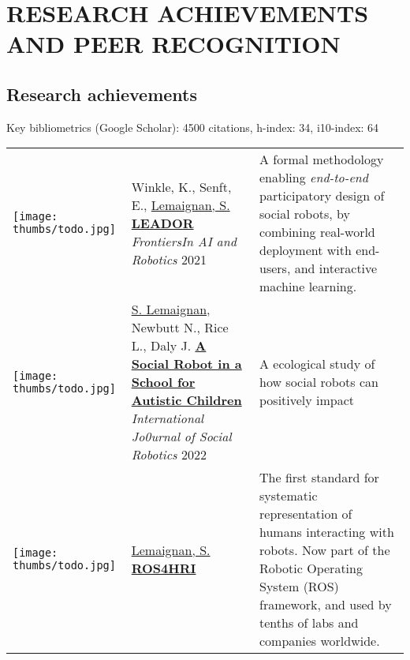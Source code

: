 \section{RESEARCH ACHIEVEMENTS AND PEER RECOGNITION}

\subsection{Research achievements}

Key bibliometrics (Google Scholar): 4500 citations, h-index: 34, i10-index: 64


\hspace*{-0.5cm}\begin{tabular}{p{1.7cm}p{7cm}p{8cm}}

    \vspace{-0.2cm}\texttt{[image: thumbs/todo.jpg]} &
    Winkle, K., Senft, E., \ul{Lemaignan, S.}
    \newline\href{}{\textbf{LEADOR}}
    \newline \textit{FrontiersIn AI and Robotics} 2021
    & \small A formal methodology enabling \emph{end-to-end} participatory
    design of social robots, by combining real-world deployment with end-users,
    and interactive machine learning.\textbf{} \\

    \vspace{-0.2cm}\texttt{[image: thumbs/todo.jpg]} &
    \ul{S. Lemaignan}, Newbutt N., Rice L., Daly J.
    \newline\href{https://doi.org/10.1007/s12369-022-00928-4}{\textbf{A Social Robot in a School for Autistic Children}}
    \newline \textit{International Jo0urnal of Social Robotics} 2022
    & \small A ecological study of how social robots can positively impact \textbf{} \\






    \vspace{-0.2cm}\texttt{[image: thumbs/todo.jpg]} &
    \ul{Lemaignan, S.}
    \newline\href{https://wiki.ros.org/hri}{\textbf{ROS4HRI}}
    \newline 2022
    & \small The first standard for systematic representation of humans
    interacting with robots. Now part of the Robotic Operating System (ROS)
    framework, and used by tenths of labs and companies worldwide. \textbf{} \\



\end{tabular}
